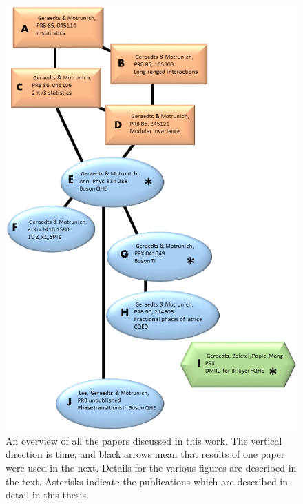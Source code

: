 \begin{figure}
\includegraphics[width=\linewidth]{figures/publications.eps}
\caption{ An overview of all the papers discussed in this work. The vertical direction is time, and black arrows mean that results of one paper were used in the next. Details for the various figures are described in the text. Asterisks indicate the publications which are described in detail in this thesis.
\label{papers}}
\end{figure}

